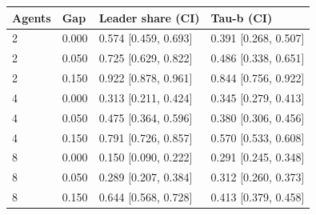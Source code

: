 \begin{center}\small\begin{tabular}{llll}\toprule
Agents & Gap & Leader share (CI) & Tau-b (CI) \\\midrule
2 & 0.000 & 0.574 [0.459, 0.693] & 0.391 [0.268, 0.507] \\
2 & 0.050 & 0.725 [0.629, 0.822] & 0.486 [0.338, 0.651] \\
2 & 0.150 & 0.922 [0.878, 0.961] & 0.844 [0.756, 0.922] \\
4 & 0.000 & 0.313 [0.211, 0.424] & 0.345 [0.279, 0.413] \\
4 & 0.050 & 0.475 [0.364, 0.596] & 0.380 [0.306, 0.456] \\
4 & 0.150 & 0.791 [0.726, 0.857] & 0.570 [0.533, 0.608] \\
8 & 0.000 & 0.150 [0.090, 0.222] & 0.291 [0.245, 0.348] \\
8 & 0.050 & 0.289 [0.207, 0.384] & 0.312 [0.260, 0.373] \\
8 & 0.150 & 0.644 [0.568, 0.728] & 0.413 [0.379, 0.458] \\
\bottomrule\end{tabular}\end{center}
